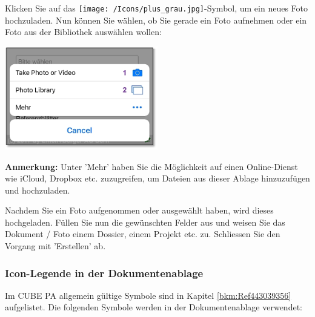 Klicken Sie auf das \texttt{[image: /Icons/plus\_grau.jpg]}-Symbol, um ein neues Foto hochzuladen. Nun können Sie wählen, ob Sie gerade ein Foto aufnehmen oder ein Foto aus der Bibliothek auswählen wollen:

\vspace{\baselineskip}

\hspace{15mm} \includegraphics[height=45mm]{../chapters/11_Dokumentenablage/pictures/11-mob09_Foto_aufnehmen.jpg}

\vspace{\baselineskip}

\textbf{Anmerkung:} Unter 'Mehr' haben Sie die Möglichkeit auf einen Online-Dienst wie iCloud, Dropbox etc. zuzugreifen, um Dateien aus dieser Ablage hinzuzufügen und hochzuladen.

\vspace{\baselineskip}

Nachdem Sie ein Foto aufgenommen oder ausgewählt haben, wird dieses hochgeladen. Füllen Sie nun die gewünschten Felder aus und weisen Sie das Dokument / Foto einem Dossier, einem Projekt etc. zu. Schliessen Sie den Vorgang mit 'Erstellen' ab.



\pagebreak

\subsubsection{Icon-Legende in der Dokumentenablage}

Im CUBE PA allgemein gültige Symbole sind in Kapitel \ref{bkm:Ref443039356} aufgelistet. Die folgenden Symbole werden in der Dokumentenablage verwendet:

\vspace{\baselineskip}

